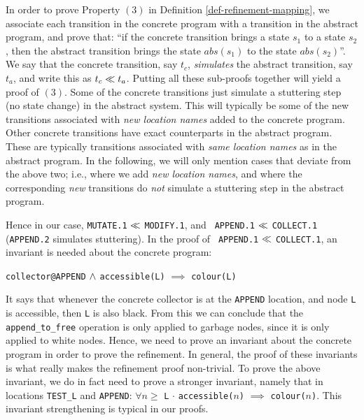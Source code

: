 In  order      to     prove   Property    $(3)$      in     Definition
\ref{def-refinement-mapping}, we   associate  each transition  in  the
concrete program with a transition  in the abstract program, and prove
that: ``if the  concrete transition brings   a state $s_1$ to  a state
$s_2$, then the abstract transition brings the state $abs(s_1)$ to the
state $abs(s_2)$''.   We say that  the concrete transition, say $t_c$,
{\em simulates} the abstract transition, say $t_a$,  and write this as
$t_c \ll t_a$.  Putting  all these sub-proofs together will yield
a proof of $(3)$.   Some of the  concrete transitions just simulate  a
stuttering step  (no state change) in the  abstract system.  This will
typically be   some of the  new  transitions associated with  {\em new
  location  names}  added  to  the  concrete program.  
Other   concrete transitions have   exact counterparts in the abstract
program.   These are typically transitions  associated  with {\em same
  location names}  as  in the abstract program.  In the
following, we will only mention cases that deviate from the above two;
i.e.,  where  we   add  {\em  new   location   names},  and  where  the
corresponding {\em new} transitions do {\em not} simulate a stuttering
step in the abstract program.

Hence in our case, {\tt MUTATE.1} $\ll$  {\tt MODIFY.1}, and {\tt
  APPEND.1}  $\ll$ {\tt  COLLECT.1}\label{append-refines-collect}
({\tt APPEND.2} simulates   stuttering)\@.    In the proof  of    {\tt
  APPEND.1} $\ll$ {\tt COLLECT.1},  an invariant is needed  about
the concrete program:

\begin{center}
\label{refinement1-inv1}
  {\tt collector@APPEND} $\wedge$ {\tt accessible(L)} 
  $\implies$ {\tt colour(L)}
\end{center}

It says that whenever  the concrete collector is  at the {\tt  APPEND}
location, and node {\tt L} is accessible, then  {\tt L} is also black. 
From this we can conclude that the {\tt append\_to\_free} operation is
only applied to garbage nodes, since it is only applied to white nodes.
Hence, we need  to prove an  invariant about  the concrete program  in
order  to  prove  the refinement.  In   general,  the  proof of  these
invariants is what really makes the refinement  proof non-trivial.  To
prove the above invariant, we   do in fact  need  to prove a  stronger
invariant, namely that in locations  {\tt TEST\_L} and {\tt  APPEND}:
$\forall n \ge$ {\tt L} $\cdot$  
{\tt accessible(}$n${\tt )} $\implies$ {\tt colour(}$n${\tt )}. 
This invariant strengthening is typical in our proofs.


